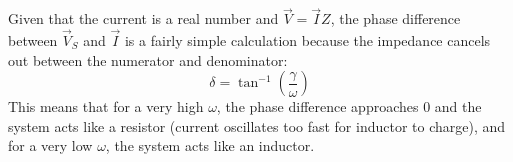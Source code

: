 \documentclass[11pt]{article}
\begin{document}
	Given that the current is a real number and $\vec{V} = \vec{I} Z$, the phase difference between $\vec{V}_S$ and $\vec{I}$ is a fairly simple calculation because the impedance cancels out between the numerator and denominator:
	\begin{equation}
		\delta = \tan^{-1}\left(\frac{\gamma}{\omega}\right)
	\end{equation}
	This means that for a very high $\omega$, the phase difference approaches 0 and the system acts like a resistor (current oscillates too fast for inductor to charge), and for a very low $\omega$, the system acts like an inductor.
%		
%		


\end{document}
